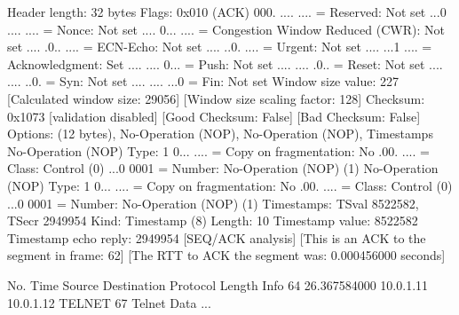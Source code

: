     Header length: 32 bytes
    Flags: 0x010 (ACK)
        000. .... .... = Reserved: Not set
        ...0 .... .... = Nonce: Not set
        .... 0... .... = Congestion Window Reduced (CWR): Not set
        .... .0.. .... = ECN-Echo: Not set
        .... ..0. .... = Urgent: Not set
        .... ...1 .... = Acknowledgment: Set
        .... .... 0... = Push: Not set
        .... .... .0.. = Reset: Not set
        .... .... ..0. = Syn: Not set
        .... .... ...0 = Fin: Not set
    Window size value: 227
    [Calculated window size: 29056]
    [Window size scaling factor: 128]
    Checksum: 0x1073 [validation disabled]
        [Good Checksum: False]
        [Bad Checksum: False]
    Options: (12 bytes), No-Operation (NOP), No-Operation (NOP), Timestamps
        No-Operation (NOP)
            Type: 1
                0... .... = Copy on fragmentation: No
                .00. .... = Class: Control (0)
                ...0 0001 = Number: No-Operation (NOP) (1)
        No-Operation (NOP)
            Type: 1
                0... .... = Copy on fragmentation: No
                .00. .... = Class: Control (0)
                ...0 0001 = Number: No-Operation (NOP) (1)
        Timestamps: TSval 8522582, TSecr 2949954
            Kind: Timestamp (8)
            Length: 10
            Timestamp value: 8522582
            Timestamp echo reply: 2949954
    [SEQ/ACK analysis]
        [This is an ACK to the segment in frame: 62]
        [The RTT to ACK the segment was: 0.000456000 seconds]

No.     Time           Source                Destination           Protocol Length Info
     64 26.367584000   10.0.1.11             10.0.1.12             TELNET   67     Telnet Data ...


